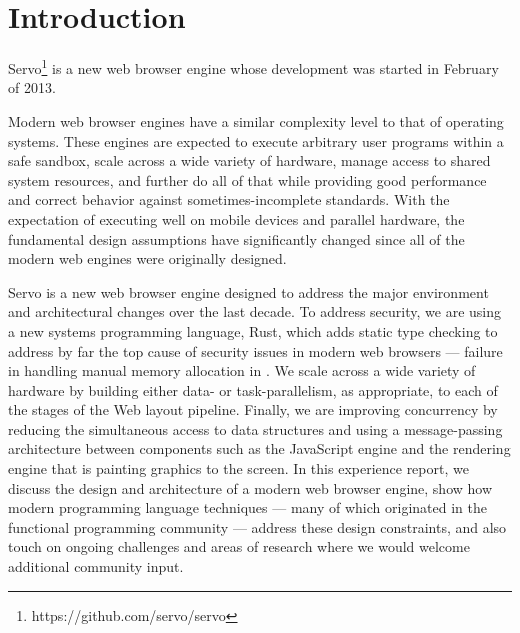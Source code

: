 
\section{Introduction}
\label{sec:intro}
Servo\footnote{https://github.com/servo/servo} is a new web browser engine whose development
was started in February of 2013.

Modern web browser engines have a similar complexity level to that of operating systems.
These engines are expected to execute arbitrary user programs within a safe sandbox, scale 
across a wide variety of hardware, manage access to shared system resources, and further 
do all of that while providing good performance and correct behavior
against sometimes-incomplete standards.
With the expectation of executing well on mobile devices and parallel hardware, the 
fundamental design assumptions have significantly changed since all of the modern
web engines were originally designed.

Servo is a new web browser engine designed to address the major environment and 
architectural changes over the last decade.
To address security, we are using a new systems programming language, Rust,
which adds static type checking to address by far the top cause of security
issues in modern web browsers --- failure in handling manual memory allocation
in \Cplusplus{}.
We scale across a wide variety of hardware by building either data- or task-parallelism, 
as appropriate, to each of the stages of the Web layout pipeline.
Finally, we are improving concurrency by reducing the simultaneous access to data
structures and using a message-passing architecture between components such as the
JavaScript engine and the rendering engine that is painting graphics to the screen.
In this experience report, we discuss the design and architecture of a modern web 
browser engine, show how modern programming language techniques --- many of which
originated in the functional programming community --- address these design 
constraints, and also touch on ongoing challenges and areas of research where we
would welcome additional community input.

